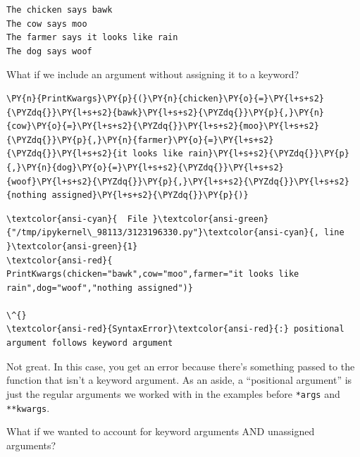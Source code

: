    \begin{Verbatim}[commandchars=\\\{\}]
The chicken says bawk
The cow says moo
The farmer says it looks like rain
The dog says woof
    \end{Verbatim}

    What if we include an argument without assigning it to a keyword?

    \begin{tcolorbox}[breakable, size=fbox, boxrule=1pt, pad at break*=1mm,colback=cellbackground, colframe=cellborder]
\begin{Verbatim}[commandchars=\\\{\}]
\PY{n}{PrintKwargs}\PY{p}{(}\PY{n}{chicken}\PY{o}{=}\PY{l+s+s2}{\PYZdq{}}\PY{l+s+s2}{bawk}\PY{l+s+s2}{\PYZdq{}}\PY{p}{,}\PY{n}{cow}\PY{o}{=}\PY{l+s+s2}{\PYZdq{}}\PY{l+s+s2}{moo}\PY{l+s+s2}{\PYZdq{}}\PY{p}{,}\PY{n}{farmer}\PY{o}{=}\PY{l+s+s2}{\PYZdq{}}\PY{l+s+s2}{it looks like rain}\PY{l+s+s2}{\PYZdq{}}\PY{p}{,}\PY{n}{dog}\PY{o}{=}\PY{l+s+s2}{\PYZdq{}}\PY{l+s+s2}{woof}\PY{l+s+s2}{\PYZdq{}}\PY{p}{,}\PY{l+s+s2}{\PYZdq{}}\PY{l+s+s2}{nothing assigned}\PY{l+s+s2}{\PYZdq{}}\PY{p}{)}
\end{Verbatim}
\end{tcolorbox}

    \begin{Verbatim}[commandchars=\\\{\}, frame=single, framerule=2mm, rulecolor=\color{outerrorbackground}]
\textcolor{ansi-cyan}{  File }\textcolor{ansi-green}{"/tmp/ipykernel\_98113/3123196330.py"}\textcolor{ansi-cyan}{, line }\textcolor{ansi-green}{1}
\textcolor{ansi-red}{    PrintKwargs(chicken="bawk",cow="moo",farmer="it looks like rain",dog="woof","nothing assigned")}
                                                                                                  \^{}
\textcolor{ansi-red}{SyntaxError}\textcolor{ansi-red}{:} positional argument follows keyword argument

    \end{Verbatim}

    Not great. In this case, you get an error because there's something
passed to the function that isn't a keyword argument. As an aside, a
``positional argument'' is just the regular arguments we worked with in
the examples before \texttt{*args} and \texttt{**kwargs}.

What if we wanted to account for keyword arguments AND unassigned
arguments?

